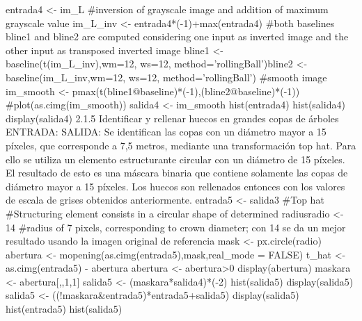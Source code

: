 entrada4 <- im_L
#inversion of grayscale image and addition of maximum grayscale value
im_L_inv <- entrada4*(-1)+max(entrada4)
#both baselines bline1 and bline2 are computed considering one input as inverted image
and the other input as transposed inverted image
bline1 <- baseline(t(im_L_inv),wm=12, ws=12, method='rollingBall')bline2 <- baseline(im_L_inv,wm=12, ws=12, method='rollingBall')
#smooth image
im_smooth <- pmax(t(bline1@baseline)*(-1),(bline2@baseline)*(-1))
#plot(as.cimg(im_smooth))
salida4 <- im_smooth
hist(entrada4)
hist(salida4)
display(salida4)
2.1.5 Identificar y rellenar huecos en grandes copas de árboles
ENTRADA:
SALIDA:
Se identifican las copas con un diámetro mayor a 15 píxeles, que corresponde a 7,5
metros, mediante una transformación top hat. Para ello se utiliza un elemento
estructurante circular con un diámetro de 15 píxeles. El resultado de esto es una máscara
binaria que contiene solamente las copas de diámetro mayor a 15 píxeles. Los huecos
son rellenados entonces con los valores de escala de grises obtenidos anteriormente.
entrada5 <- salida3
#Top hat
#Structuring element consists in a circular shape of determined radiusradio <- 14 #radius of 7 pixels, corresponding to crown diameter; con 14 se da un mejor
resultado usando la imagen original de referencia
mask <- px.circle(radio)
abertura <- mopening(as.cimg(entrada5),mask,real_mode = FALSE)
t_hat <- as.cimg(entrada5) - abertura
abertura <- abertura>0
display(abertura)
maskara <- abertura[,,1,1]
salida5 <- (maskara*salida4)*(-2)
hist(salida5)
display(salida5)
salida5 <- ((!maskara&entrada5)*entrada5+salida5)
display(salida5)
hist(entrada5)
hist(salida5)

